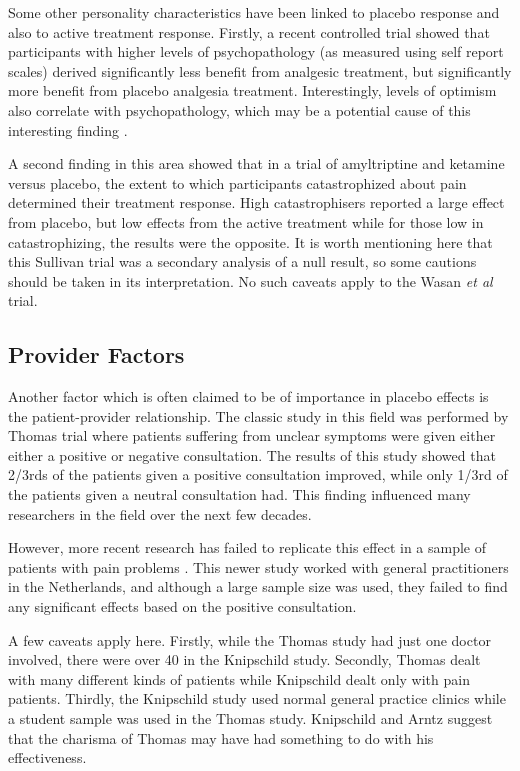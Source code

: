 Some other personality characteristics have been linked to placebo response and also to active treatment response. Firstly, a recent controlled trial \cite{Wasan2005}  showed that participants with higher levels of psychopathology (as measured using self report scales) derived significantly less benefit from analgesic treatment, but significantly more benefit from placebo analgesia treatment. Interestingly, levels of optimism also correlate with psychopathology, which may be a potential cause of this interesting finding \cite{Carver2010}.  

A second finding in this area \cite{Sullivan2008}  showed that in a trial of amyltriptine and ketamine versus placebo, the extent to which participants catastrophized about pain determined their treatment response. High catastrophisers reported a large effect from placebo, but low effects from the active treatment while for those low in catastrophizing, the results were the opposite. It is worth mentioning here that this Sullivan trial was a secondary analysis of a null result, so some cautions should be taken in its interpretation. No such caveats apply to the Wasan \textit{et al} trial. 




\subsection{Provider Factors}

Another factor which is often claimed to be of importance in placebo effects is the patient-provider relationship. The classic study in this field was performed by Thomas \cite{thomas1987general}  trial where  patients suffering from unclear symptoms were given either either a positive or negative consultation.  The results of this study showed that 2/3rds of the patients given a positive consultation improved, while only 1/3rd of the patients given a neutral consultation had. This finding influenced many researchers in the field over the next few decades. 

However, more recent research has failed to replicate this effect in a sample of patients with pain problems \cite{Knipschild2005}. This newer study worked with general practitioners in the Netherlands, and although a large sample size was used, they failed to find any significant effects based on the positive consultation. 

A few caveats apply here. Firstly, while the Thomas study had just one doctor involved, there were over 40 in the Knipschild study. Secondly, Thomas dealt with many different kinds of patients while Knipschild dealt only with pain patients. Thirdly, the Knipschild study used normal general practice clinics while a student sample was used in the Thomas study. Knipschild and Arntz suggest that the charisma of Thomas may have had something to do with his effectiveness. 

